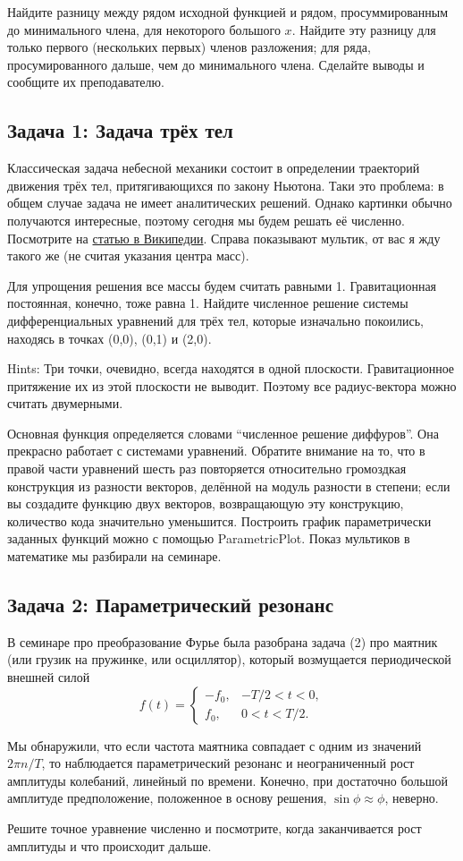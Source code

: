 \documentclass[a4paper,12pt]{article}
\theoremstyle{plain} %
\theoremstyle{definition} %
\theoremstyle{remark} %
\begin{document}
Найдите разницу между рядом исходной функцией и рядом, просуммированным до минимального члена, для некоторого большого $x$. Найдите эту разницу для только первого (нескольких первых) членов разложения; для ряда, просумированного дальше, чем до минимального члена. Сделайте выводы и сообщите их преподавателю.

\subsection*{Задача 1: Задача трёх тел}
Классическая задача небесной механики состоит в определении траекторий движения трёх тел, притягивающихся по закону Ньютона. Таки это проблема: в общем случае задача не имеет аналитических решений. Однако картинки обычно получаются интересные, поэтому сегодня мы будем решать её численно. Посмотрите на \href{https://ru.wikipedia.org/wiki/Задача_трёх_тел}{статью в Википедии}. Справа показывают мультик, от вас я жду такого же (не считая указания центра масс).

Для упрощения решения все массы будем считать равными 1. Гравитационная постоянная, конечно, тоже равна 1. Найдите численное решение системы дифференциальных уравнений для трёх тел, которые изначально покоились, находясь в точках (0,0), (0,1) и (2,0).

Hints: Три точки, очевидно, всегда находятся в одной плоскости. Гравитационное притяжение их из этой плоскости не выводит. Поэтому все радиус-вектора можно считать двумерными. 

Основная функция определяется словами ``численное решение диффуров''. Она прекрасно работает с системами уравнений. Обратите внимание на то, что в правой части уравнений шесть раз повторяется относительно громоздкая конструкция из разности векторов, делённой на модуль разности в степени; если вы создадите функцию двух векторов, возвращающую эту конструкцию, количество кода значительно уменьшится. Построить график параметрически заданных функций можно с помощью ParametricPlot. Показ мультиков в математике мы разбирали на семинаре.

\subsection*{Задача 2: Параметрический резонанс}

В семинаре про преобразование Фурье была разобрана задача (2) про маятник (или грузик на пружинке, или осциллятор), который возмущается периодической внешней силой 
\begin{equation}
	f(t) = \begin{cases}
		-f_0,& -T/2<t<0, \\
		f_0,&  0<t<T/2.
	\end{cases}
\end{equation}

Мы обнаружили, что если частота маятника совпадает с одним из значений $2\pi n/T$, то наблюдается параметрический резонанс и неограниченный рост амплитуды колебаний, линейный по времени. Конечно, при достаточно большой амплитуде предположение, положенное в основу решения, $\sin \phi \approx \phi$, неверно.

Решите точное уравнение численно и посмотрите, когда заканчивается рост амплитуды и что происходит дальше.
\end{document}
